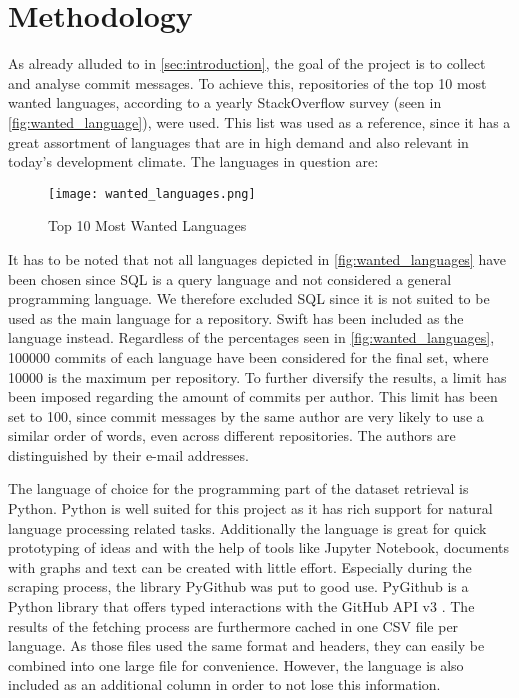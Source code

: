 \section{Methodology}
\label{sec:methodology}

As already alluded to in \autoref{sec:introduction}, the goal of the project is to
collect and analyse commit messages. To achieve this, repositories of the top 10 most
wanted languages, according to a yearly StackOverflow survey (seen in
\autoref{fig:wanted_language}), were used. This list was used as a reference, since it
has a great assortment of languages that are in high demand and also relevant
in today's development climate. The languages in question are:

\begin{figure}[H]
  \centering
  \texttt{[image: wanted\_languages.png]}
  \caption{Top 10 Most Wanted Languages \cite{so-survey}}
  \label{fig:wanted_languages}
\end{figure}

It has to be noted that not all languages depicted in \autoref{fig:wanted_languages}
have been chosen since SQL is a query language and not considered a general
programming language. We therefore excluded SQL since
it is not suited to be used as the main language for a repository.
Swift has been included as the  language instead.
Regardless of the percentages seen in \autoref{fig:wanted_languages}, 100000 commits of each
language have been considered for the final set, where 10000 is the maximum per
repository. To further diversify the results, a limit has been imposed regarding
the amount of commits per author. This limit has been set to 100, since commit
messages by the same author are very likely to use a similar order of words,
even across different repositories. The authors are distinguished by their
e-mail addresses.

The language of choice for the programming part of the dataset retrieval
is Python. Python is well suited for this project as it has rich support for
natural language processing related tasks. Additionally the language is great
for quick prototyping of ideas and with the help of tools like Jupyter
Notebook, documents with graphs and text can be created with little effort. Especially
during the scraping process, the library PyGithub was put to good use. PyGithub
is a Python library that offers typed interactions with the GitHub API v3
\cite{pygithub}. The results of the fetching process are furthermore cached in
one CSV file per language. As those files used the same format and headers, they
can easily be combined into one large file for convenience. However, the language
is also included as an additional column in order to not lose this information.

